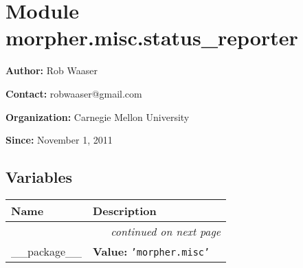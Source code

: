 %
%
%


\section{Module morpher.misc.status\_reporter}

    \label{morpher:misc:status_reporter}
\textbf{Author:} Rob Waaser



\textbf{Contact:} robwaaser@gmail.com



\textbf{Organization:} Carnegie Mellon University



\textbf{Since:} November 1, 2011





  \subsection{Variables}

    \vspace{-1cm}
\hspace{\varindent}\begin{longtable}{|p{\varnamewidth}|p{\vardescrwidth}|l}
\cline{1-2}
\cline{1-2} \centering \textbf{Name} & \centering \textbf{Description}& \\
\cline{1-2}
\endhead\cline{1-2}\multicolumn{3}{r}{\small\textit{continued on next page}}\\\endfoot\cline{1-2}
\endlastfoot\raggedright \_\-\_\-p\-a\-c\-k\-a\-g\-e\-\_\-\_\- & \raggedright \textbf{Value:} 
{\tt \texttt{'}\texttt{morpher.misc}\texttt{'}}&\\
\cline{1-2}
\end{longtable}


